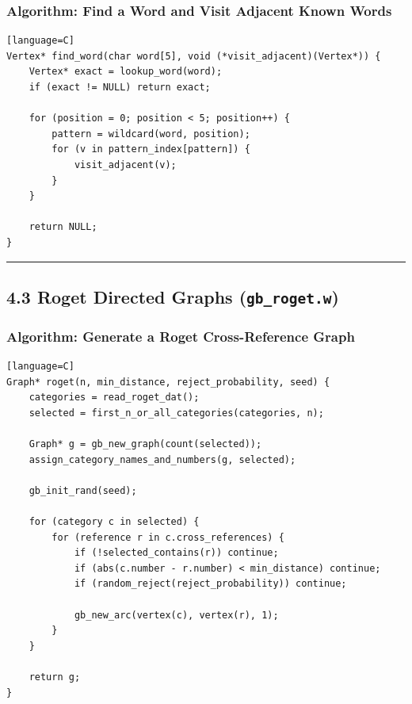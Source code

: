 \documentclass[11pt]{article}
\begin{document}
\subsubsection{Algorithm: Find a Word and Visit Adjacent Known Words}\label{algorithm-find-a-word-and-visit-adjacent-known-words}

\begin{verbatim}[language=C]
Vertex* find_word(char word[5], void (*visit_adjacent)(Vertex*)) {
    Vertex* exact = lookup_word(word);
    if (exact != NULL) return exact;

    for (position = 0; position < 5; position++) {
        pattern = wildcard(word, position);
        for (v in pattern_index[pattern]) {
            visit_adjacent(v);
        }
    }

    return NULL;
}
\end{verbatim}

\begin{center}\rule{0.5\linewidth}{0.5pt}\end{center}

\subsection{\texorpdfstring{4.3 Roget Directed Graphs (\texttt{gb\_roget.w})}{4.3 Roget Directed Graphs (gb\_roget.w)}}\label{roget-directed-graphs-gb_roget.w}

\subsubsection{Algorithm: Generate a Roget Cross-Reference Graph}\label{algorithm-generate-a-roget-cross-reference-graph}

\begin{verbatim}[language=C]
Graph* roget(n, min_distance, reject_probability, seed) {
    categories = read_roget_dat();
    selected = first_n_or_all_categories(categories, n);

    Graph* g = gb_new_graph(count(selected));
    assign_category_names_and_numbers(g, selected);

    gb_init_rand(seed);

    for (category c in selected) {
        for (reference r in c.cross_references) {
            if (!selected_contains(r)) continue;
            if (abs(c.number - r.number) < min_distance) continue;
            if (random_reject(reject_probability)) continue;

            gb_new_arc(vertex(c), vertex(r), 1);
        }
    }

    return g;
}
\end{verbatim}
\end{document}
